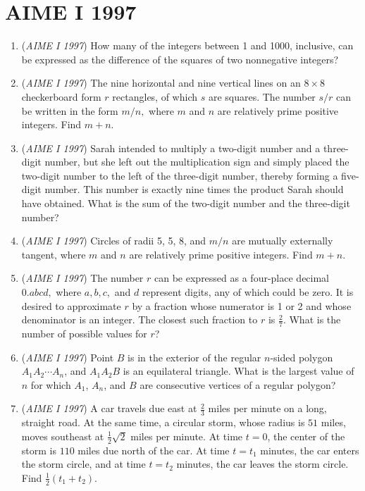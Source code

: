 \section{AIME I 1997}
        \begin{enumerate}
        	\item (\textit{AIME I 1997}) How many of the integers between 1 and 1000, inclusive, can be expressed as the difference of the squares of two nonnegative integers?


 

	\item (\textit{AIME I 1997}) The nine horizontal and nine vertical lines on an $8\times8$ checkerboard form $r$ rectangles, of which $s$ are squares.  The number $s/r$ can be written in the form $m/n,$ where $m$ and $n$ are relatively prime positive integers.  Find $m + n.$


	\item (\textit{AIME I 1997}) Sarah intended to multiply a two-digit number and a three-digit number, but she left out the multiplication sign and simply placed the two-digit number to the left of the three-digit number, thereby forming a five-digit number.  This number is exactly nine times the product Sarah should have obtained.  What is the sum of the two-digit number and the three-digit number?


 

	\item (\textit{AIME I 1997}) Circles of radii 5, 5, 8, and $m/n$ are mutually externally tangent, where $m$ and $n$ are relatively prime positive integers.  Find $m + n.$


	\item (\textit{AIME I 1997}) The number $r$ can be expressed as a four-place decimal $0.abcd,$ where $a, b, c,$ and $d$ represent digits, any of which could be zero.  It is desired to approximate $r$ by a fraction whose numerator is 1 or 2 and whose denominator is an integer. The closest such fraction to $r$ is $\frac 27.$  What is the number of possible values for $r$?


 

	\item (\textit{AIME I 1997}) Point $B$ is in the exterior of the regular $n$-sided polygon $A_1A_2\cdots A_n$, and $A_1A_2B$ is an equilateral triangle. What is the largest value of $n$ for which $A_1$, $A_n$, and $B$ are consecutive vertices of a regular polygon?


 

	\item (\textit{AIME I 1997}) A car travels due east at $\frac 23$ miles per minute on a long, straight road. At the same time, a circular storm, whose radius is $51$ miles, moves southeast at $\frac 12\sqrt{2}$ miles per minute. At time $t=0$, the center of the storm is $110$ miles due north of the car. At time $t=t_1$ minutes, the car enters the storm circle, and at time $t=t_2$ minutes, the car leaves the storm circle. Find $\frac 12(t_1+t_2)$.



\end{enumerate}
